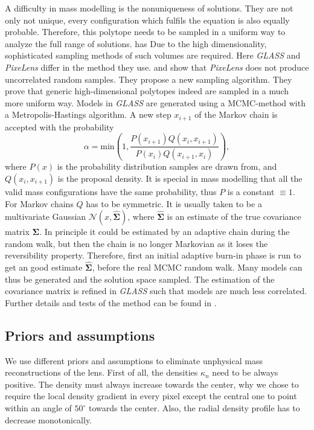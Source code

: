 \documentclass[useAMS,usenatbib]{mn2e}
\begin{document}
A difficulty in mass modelling is the nonuniqueness of solutions. They are not only not unique, every configuration which fulfils the equation is also equally probable. Therefore, this polytope needs to be sampled in a uniform way to analyze the full range of solutions. has Due to the high dimensionality, sophisticated sampling methods of such volumes are required. Here \textit{GLASS} and \textit{PixeLens} differ in the method they use. \cite{2008ApJ...679...17C} and \cite{2012MNRAS.425.3077L} show that \textit{PixeLens} does not produce uncorrelated random samples. They propose a new sampling algorithm. They prove that generic high-dimensional polytopes indeed are sampled in a much more uniform way. Models in \textit{GLASS} are generated using a MCMC-method with a Metropolis-Hastings algorithm. A new step $x_{i+1}$ of the Markov chain is accepted with the probability
\begin{equation}
 \alpha = \mathrm{min}\left(1,\frac{P(x_{i+1})Q(x_{i},x_{i+1})}{P(x_{i})Q(x_{i+1},x_{i})}\right),
\end{equation}
where $P(x)$ is the probability distribution samples are drawn from, and $Q(x_{i},x_{i+1})$ is the proposal density. It is special in mass modelling that all the valid mass configurations have the same probability, thus $P$ is a constant $\equiv1$. For Markov chains $Q$ has to be symmetric. It is usually taken to be a multivariate Gaussian $\mathcal{N}(x,\hat{\boldsymbol\Sigma})$, where $\hat{\boldsymbol\Sigma}$ is an estimate of the true covariance matrix $\boldsymbol\Sigma$. In principle it could be estimated by an adaptive chain during the random walk, but then the chain is no longer Markovian as it loses the reversibility property. Therefore, first an initial adaptive burn-in phase is run to get an good estimate $\hat{\boldsymbol\Sigma}$, before the real MCMC random walk. Many models can thus be generated and the solution space sampled. The estimation of the covariance matrix is refined in \textit{GLASS} such that models are much less correlated. Further details and tests of the method can be found in \cite{2012MNRAS.425.3077L}.

\subsection{Priors and assumptions}
We use different priors and assumptions to eliminate unphysical mass reconstructions of the lens. First of all, the densities $\kappa_{n}$ need to be always positive. The density must always increase towards the center, why we chose to require the local density gradient in every pixel except the central one to point within an angle of $50^{\circ}$ towards the center. Also, the radial density profile has to decrease monotonically.
\end{document}
